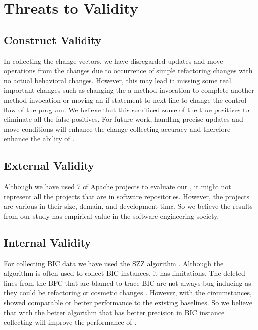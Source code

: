 \section{Threats to Validity}
\subsection{Construct Validity}
In collecting the change vectors, we have disregarded updates and move operations from the changes due to occurrence of simple refactoring changes with no actual behavioral changes.
However, this may lead in missing some real important changes such as changing the a method invocation to complete another method invocation or moving an if statement to next line to change the control flow of the program.
We believe that this sacrificed some of the true positives to eliminate all the false positives.
For future work, handling precise updates and move conditions will enhance the change collecting accuracy and therefore enhance the ability of {\simfinmo}.

\subsection{External Validity}
Although we have used 7 of Apache projects to evaluate our {\simfinmo}, it might not represent all the projects that are in software repositories.
However, the projects are various in their size, domain, and development time.
So we believe the results from our study has empirical value in the software engineering society.

\subsection{Internal Validity}
For collecting BIC data we have used the SZZ algorithm \cite{sliwerski2005changes}.
Although the algorithm is often used to collect BIC instances, it has limitations.
The deleted lines from the BFC that are blamed to trace BIC are not always bug inducing as they could be refactoring or cosmetic changes \cite{neto2018impact}.
However, with the circumstances, {\simfinmo} showed comparable or better performance to the existing baselines.
So we believe that with the better algorithm that has better precision in BIC instance collecting will improve the performance of {\simfinmo}.
